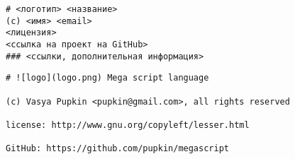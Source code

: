 \label{readme}

\begin{verbatim}
# <логотип> <название>
(c) <имя> <email>
<лицензия>
<ссылка на проект на GitHub>
### <ссылки, дополнительная информация>
\end{verbatim}
\begin{lstlisting}[title=README.md]
# ![logo](logo.png) Mega script language

(c) Vasya Pupkin <pupkin@gmail.com>, all rights reserved

license: http://www.gnu.org/copyleft/lesser.html

GitHub: https://github.com/pupkin/megascript
\end{lstlisting}